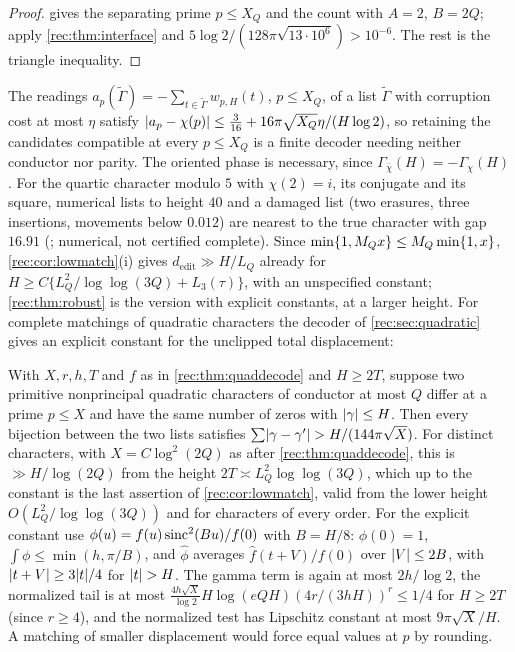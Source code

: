 \begin{proof}
 gives the separating prime $p\le X_Q$ and the count with $A=2$, $B=2Q$; apply
\cref{rec:thm:interface} and $5\log2/(128\pi\sqrt{13\cdot10^6})>10^{-6}$. The rest is the triangle inequality.
\end{proof}

The readings $a_p(\widetilde\Gamma)=-\sum_{t\in\widetilde\Gamma}w_{p,H}(t)$, $p\le X_Q$, of a list $\widetilde\Gamma$ with corruption cost
at most $\eta$ satisfy $\lvert a_p-\chi(p)\rvert\le\tfrac3{16}+16\pi\sqrt{X_Q}\eta/(H\log2)$, so retaining the candidates
compatible at every $p\le X_Q$ is a finite decoder needing neither conductor nor parity. The oriented
phase is necessary, since $\Gamma_{\bar\chi}(H)=-\Gamma_\chi(H)$. For the quartic character modulo $5$ with
$\chi(2)=i$, its conjugate and its square, numerical lists to height $40$ and a damaged list (two
erasures, three insertions, movements below $0.012$) are nearest to the true character with gap
$16.91$ (; numerical, not certified
complete). Since $\min\{1,M_Qx\}\le M_Q\min\{1,x\}$, \cref{rec:cor:lowmatch}(i) gives
$d_{\mathrm{edit}}\gg H/L_Q$ already for $H\ge C\{L_Q^2/\log\log(3Q)+L_3(\tau)\}$, with an unspecified constant;
\cref{rec:thm:robust} is the version with explicit constants, at a larger height. For complete matchings of
quadratic characters the decoder of \cref{rec:sec:quadratic} gives an explicit constant for the unclipped
total displacement:

\begin{remark}\label{rec:thm:quaddisplace}
With $X,r,h,T$ and $f$ as in \cref{rec:thm:quaddecode} and $H\ge2T$, suppose two primitive nonprincipal
quadratic characters of conductor at most $Q$ differ at a prime $p\le X$ and have the same number of zeros
with $\lvert\gamma\rvert\le H$. Then every bijection between the two lists satisfies
$\sum\lvert\gamma-\gamma'\rvert>H/(144\pi\sqrt X)$. For distinct characters, with $X=C\log^2(2Q)$ as after
\cref{rec:thm:quaddecode}, this is $\gg H/\log(2Q)$ from the height $2T\asymp L_Q^2\log\log(3Q)$, which up to
the constant is the last assertion of \cref{rec:cor:lowmatch}, valid from the lower height
$O(L_Q^2/\log\log(3Q))$ and for characters of every order. For the explicit constant use
$\phi(u)=f(u)\operatorname{sinc}^2(Bu)/f(0)$ with $B=H/8$: $\phi(0)=1$, $\int\phi\le\min(h,\pi/B)$, and
$\widehat\phi$ averages $\widehat f(t+V)/f(0)$ over $\lvert V\rvert\le2B$, with $\lvert t+V\rvert\ge3\lvert t\rvert/4$ for
$\lvert t\rvert>H$. The gamma term is again at most $2h/\log2$, the normalized tail is at most
$\frac{4h\sqrt X}{\log2}H\log(eQH)(4r/(3hH))^r\le1/4$ for $H\ge2T$ (since $r\ge4$), and the
normalized test has Lipschitz constant at most $9\pi\sqrt X/H$. A matching of smaller displacement
would force equal values at $p$ by rounding.
\end{remark}

